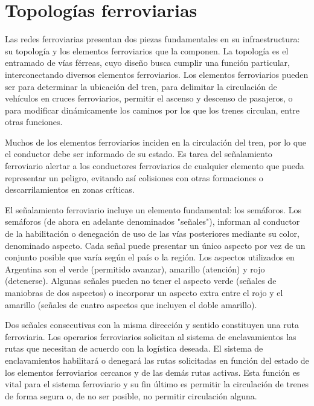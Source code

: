 \section{Topologías ferroviarias}
    \label{sec:topologias}
    Las redes ferroviarias presentan dos piezas fundamentales en su infraestructura: su topología y los elementos ferroviarios que la componen. La topología es el entramado de vías férreas, cuyo diseño busca cumplir una función particular, interconectando diversos elementos ferroviarios. Los elementos ferroviarios pueden ser para determinar la ubicación del tren, para delimitar la circulación de vehículos en cruces ferroviarios, permitir el ascenso y descenso de pasajeros, o para modificar dinámicamente los caminos por los que los trenes circulan, entre otras funciones.

    Muchos de los elementos ferroviarios inciden en la circulación del tren, por lo que el conductor debe ser informado de su estado. Es tarea del señalamiento ferroviario alertar a los conductores ferroviarios de cualquier elemento que pueda representar un peligro, evitando así colisiones con otras formaciones o descarrilamientos en zonas críticas. 
    
    El señalamiento ferroviario incluye un elemento fundamental: los semáforos. Los semáforos (de ahora en adelante denominados "señales"), informan al conductor de la habilitación o denegación de uso de las vías posteriores mediante su color, denominado aspecto. Cada señal puede presentar un único aspecto por vez de un conjunto posible que varía según el país o la región. Los aspectos utilizados en Argentina son el verde (permitido avanzar), amarillo (atención) y rojo (detenerse). Algunas señales pueden no tener el aspecto verde (señales de maniobras de dos aspectos) o incorporar un aspecto extra entre el rojo y el amarillo (señales de cuatro aspectos que incluyen el doble amarillo).
    
    Dos señales consecutivas con la misma dirección y sentido constituyen una ruta ferroviaria. Los operarios ferroviarios solicitan al sistema de enclavamientos las rutas que necesitan de acuerdo con la logística deseada. El sistema de enclavamientos habilitará o denegará las rutas solicitadas en función del estado de los elementos ferroviarios cercanos y de las demás rutas activas. Esta función es vital para el sistema ferroviario y su fin último es permitir la circulación de trenes de forma segura o, de no ser posible, no permitir circulación alguna.

    
    
    
    